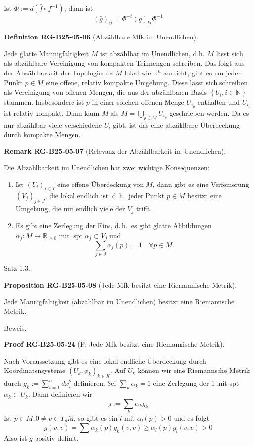 \documentclass[10pt, letterpaper]{article}
\newcommand{\CustomHeading}[3]{%
  \par\medskip\noindent%
  \textbf{#1 #2} \textnormal{(#3)}.\enskip%
}
\newenvironment{DEF}[2]{\begin{unitbox}\CustomHeading{Definition}{#1}{#2}}{\end{unitbox}}
\newenvironment{PROP}[2]{\begin{unitbox}\CustomHeading{Proposition}{#1}{#2}}{\end{unitbox}}
\newenvironment{REM}[2]{\begin{unitbox}\CustomHeading{Remark}{#1}{#2}}{\end{unitbox}}
\newenvironment{PROOF}[2]{\begin{unitbox}\CustomHeading{Proof}{#1}{#2}}{\end{unitbox}}
\begin{document}
Ist $\Phi:=d\left(\bar{f} \circ f^{-1}\right)$, dann ist
$$
(\bar{g})_{i j}=\Phi^{-t}(g)_{k l} \Phi^{-1}
$$


\begin{DEF}{RG-B25-05-06}{Abzählbare Mfk im Unendlichen}
Jede glatte Mannigfaltigkeit $M$ ist abzählbar im Unendlichen, d.h. $M$ lässt sich als abzählbare Vereinigung von kompakten Teilmengen schreiben. Das folgt aus der Abzählbarkeit der Topologie: da $M$ lokal wie $\mathbb{R}^{n}$ aussieht, gibt es um jeden Punkt $p \in M$ eine offene, relativ kompakte Umgebung. Diese lässt sich schreiben als Vereinigung von offenen Mengen, die aus der abzählbaren Basis $\left\{U_{i}, i \in \mathbb{N}\right\}$ stammen. Insbesondere ist $p$ in einer solchen offenen Menge $U_{i_{p}}$ enthalten und $U_{i_{p}}$ ist relativ kompakt. Dann kann $M$ als $M=\bigcup_{p \in M} \bar{U}_{i_{p}}$ geschrieben werden. Da es nur abzählbar viele verschiedene $U_{i}$ gibt, ist das eine abzählbare Überdeckung durch kompakte Mengen.
\end{DEF}

\begin{REM}{RG-B25-05-07}{Relevanz der Abzählbarkeit im Unendlichen}
Die Abzählbarkeit im Unendlichen hat zwei wichtige Konsequenzen:
\begin{enumerate}
  \item Ist $\left(U_{i}\right)_{i \in I}$ eine offene Überdeckung von $M$, dann gibt es eine Verfeinerung $\left(V_{j}\right)_{j \in J}$, die lokal endlich ist, d.\,h.\ jeder Punkt $p \in M$ besitzt eine Umgebung, die nur endlich viele der $V_{j}$ trifft.
  \item Es gibt eine Zerlegung der Eins, d.\,h.\ es gibt glatte Abbildungen $\alpha_{j} : M \rightarrow \mathbb{R}_{\geq 0}$ mit $\operatorname{spt} \alpha_{j} \subset V_{j}$ und
  \[
  \sum_{j \in J} \alpha_{j}(p) = 1 \quad \forall p \in M.
  \]
\end{enumerate}
\end{REM}


Satz 1.3. 

\begin{PROP}{RG-B25-05-08}{Jede Mfk besitzt eine Riemannische Metrik}
Jede Mannigfaltigkeit (abzählbar im Unendlichen) besitzt eine Riemannsche Metrik.
\end{PROP}

Beweis. 

\begin{PROOF}{RG-B25-05-24}{P: Jede Mfk besitzt eine Riemannische Metrik}
Nach Voraussetzung gibt es eine lokal endliche Überdeckung durch Koordinatensysteme $\left(U_{k}, \phi_{k}\right)_{k \in K}$. Auf $U_{k}$ können wir eine Riemannsche Metrik durch $g_{k}:=\sum_{i=1}^{n} d x_{i}^{2}$ definieren. Sei $\sum_{k} \alpha_{k}=1$ eine Zerlegung der 1 mit spt $\alpha_{k} \subset U_{k}$. Dann definieren wir
$$
g:=\sum_{k} \alpha_{k} g_{k}
$$
Ist $p \in M, 0 \neq v \in T_{p} M$, so gibt es ein $l$ mit $\alpha_{l}(p)>0$ und es folgt
$$
g(v, v)=\sum \alpha_{k}(p) g_{k}(v, v) \geq \alpha_{l}(p) g_{l}(v, v)>0
$$
Also ist $g$ positiv definit.
\end{PROOF}
\end{document}
